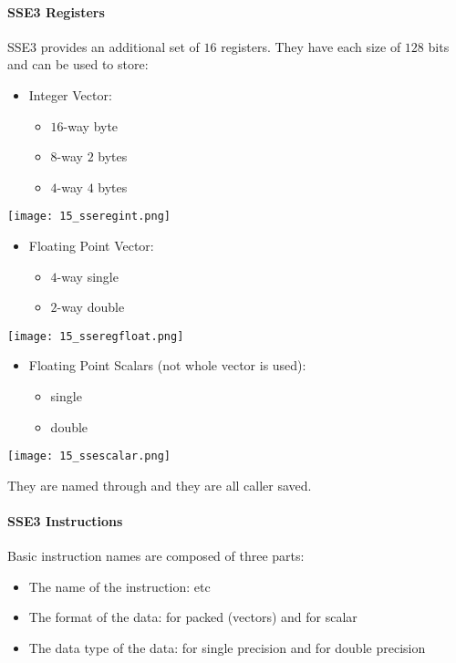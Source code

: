 \paragraph{SSE3 Registers}
SSE3 provides an additional set of $16$ registers. They have each size of $128$ bits and can be used to store:
\begin{itemize}
    \item Integer Vector:
        \begin{itemize}
            \item $16$-way byte
            \item $8$-way $2$ bytes
            \item $4$-way $4$ bytes
        \end{itemize}
\end{itemize}

\texttt{[image: 15\_sseregint.png]}

\begin{itemize}
    \item Floating Point Vector:
        \begin{itemize}
            \item $4$-way single
            \item $2$-way double
        \end{itemize}
\end{itemize}

\texttt{[image: 15\_sseregfloat.png]}


\begin{itemize}
    \item Floating Point Scalars (not whole vector is used):
        \begin{itemize}
            \item single
            \item double
        \end{itemize}
\end{itemize}

\texttt{[image: 15\_ssescalar.png]}

They are named  through  and they are all caller saved.

\paragraph{SSE3 Instructions}
Basic instruction names are composed of three parts:
\begin{itemize}
    \item The name of the instruction:  etc
    \item The format of the data:  for packed (vectors) and  for scalar
    \item The data type of the data:  for single precision and  for double precision
\end{itemize}

